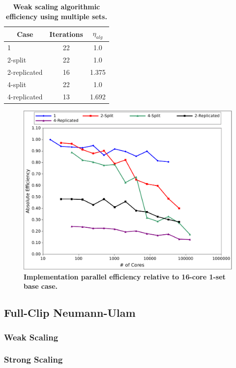 \begin{table}[h!]
  \begin{center}
    \begin{tabular}{lcc}\hline\hline
      \multicolumn{1}{c}{Case}& 
      \multicolumn{1}{c}{Iterations}&
      \multicolumn{1}{c}{$\eta_{alg}$} \\\hline
      1 & 22 & 1.0 \\
      2-split & 22 & 1.0 \\
      2-replicated & 16 & 1.375 \\
      4-split & 22 & 1.0 \\
      4-replicated & 13 & 1.692 \\
      \hline\hline
    \end{tabular}
  \end{center}
  \caption{\textbf{Weak scaling algorithmic efficiency using multiple
      sets.}}
  \label{tab:ms_weak_alg_eff}
\end{table}

\begin{figure}[htpb!]
  \begin{center}
    \includegraphics[width=6in]{chapters/parallel_mc/titan_weak_ms_impeff.pdf}
  \end{center}
  \caption{\textbf{Implementation parallel efficiency relative to 16-core
      1-set base case.}}
  \label{fig:titan_weak_ms_impeff}
\end{figure}

\clearpage

\subsection{Full-Clip Neumann-Ulam}
\label{subsec:full_clip}

\subsubsection{Weak Scaling}
\label{subsubsec:full_clip_weak}

\clearpage

\subsubsection{Strong Scaling}
\label{subsubsec:full_clip_strong}

